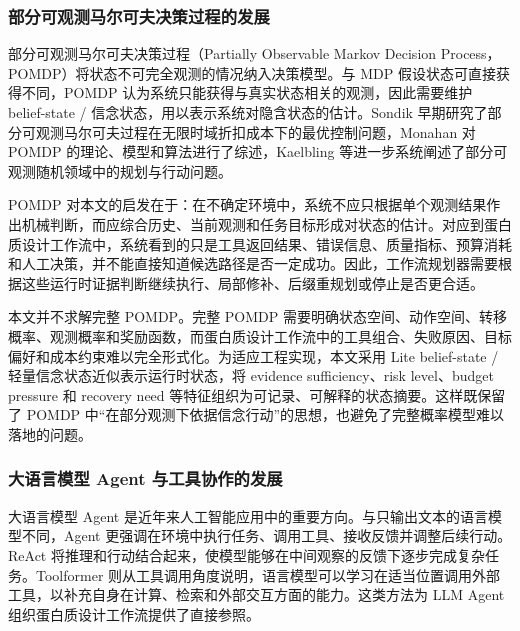 \subsubsection{部分可观测马尔可夫决策过程的发展}\label{ux90e8ux5206ux53efux89c2ux6d4bux9a6cux5c14ux53efux592bux51b3ux7b56ux8fc7ux7a0bux7684ux53d1ux5c55}

部分可观测马尔可夫决策过程（Partially Observable Markov Decision
Process，POMDP）将状态不可完全观测的情况纳入决策模型。与 MDP
假设状态可直接获得不同，POMDP
认为系统只能获得与真实状态相关的观测，因此需要维护 belief-state /
信念状态，用以表示系统对隐含状态的估计。Sondik
早期研究了部分可观测马尔可夫过程在无限时域折扣成本下的最优控制问题\citep{sondik1978pomdp}，Monahan
对 POMDP 的理论、模型和算法进行了综述\citep{monahan1982pomdp}，Kaelbling
等进一步系统阐述了部分可观测随机领域中的规划与行动问题\citep{kaelbling1998pomdp}。

POMDP
对本文的启发在于：在不确定环境中，系统不应只根据单个观测结果作出机械判断，而应综合历史、当前观测和任务目标形成对状态的估计。对应到蛋白质设计工作流中，系统看到的只是工具返回结果、错误信息、质量指标、预算消耗和人工决策，并不能直接知道候选路径是否一定成功。因此，工作流规划器需要根据这些运行时证据判断继续执行、局部修补、后缀重规划或停止是否更合适。

本文并不求解完整 POMDP。完整 POMDP
需要明确状态空间、动作空间、转移概率、观测概率和奖励函数，而蛋白质设计工作流中的工具组合、失败原因、目标偏好和成本约束难以完全形式化。为适应工程实现，本文采用
Lite belief-state / 轻量信念状态近似表示运行时状态，将 evidence
sufficiency、risk level、budget pressure 和 recovery need
等特征组织为可记录、可解释的状态摘要。这样既保留了 POMDP
中``在部分观测下依据信念行动''的思想，也避免了完整概率模型难以落地的问题。

\subsubsection{大语言模型 Agent
与工具协作的发展}\label{ux5927ux8bedux8a00ux6a21ux578b-agent-ux4e0eux5de5ux5177ux534fux4f5cux7684ux53d1ux5c55}

大语言模型 Agent
是近年来人工智能应用中的重要方向。与只输出文本的语言模型不同，Agent
更强调在环境中执行任务、调用工具、接收反馈并调整后续行动。ReAct
将推理和行动结合起来，使模型能够在中间观察的反馈下逐步完成复杂任务\citep{yao2022react}。Toolformer
则从工具调用角度说明，语言模型可以学习在适当位置调用外部工具，以补充自身在计算、检索和外部交互方面的能力\citep{schick2023toolformer}。这类方法为
LLM Agent 组织蛋白质设计工作流提供了直接参照。

